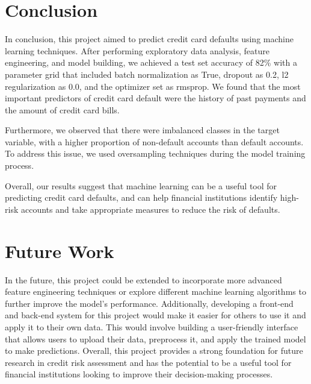 \documentclass[12pt,a4paper,oneside]{article}
\begin{document}
	\section{Conclusion}
	In conclusion, this project aimed to predict credit card defaults using machine learning techniques. After performing exploratory data analysis, feature engineering, and model building, we achieved a test set accuracy of 82\% with a parameter grid that included batch normalization as True, dropout as 0.2, l2 regularization as 0.0, and the optimizer set as rmsprop. We found that the most important predictors of credit card default were the history of past payments and the amount of credit card bills. 
	
	Furthermore, we observed that there were imbalanced classes in the target variable, with a higher proportion of non-default accounts than default accounts. To address this issue, we used oversampling techniques during the model training process. 
	
	Overall, our results suggest that machine learning can be a useful tool for predicting credit card defaults, and can help financial institutions identify high-risk accounts and take appropriate measures to reduce the risk of defaults.
	
	\section{Future Work}
	In the future, this project could be extended to incorporate more advanced
	feature engineering techniques or explore different machine learning algorithms to further improve the model's performance. Additionally, developing
	a front-end and back-end system for this project would make it easier for
	others to use it and apply it to their own data. This would involve building
	a user-friendly interface that allows users to upload their data, preprocess
	it, and apply the trained model to make predictions. Overall, this project
	provides a strong foundation for future research in credit risk assessment
	and has the potential to be a useful tool for financial institutions looking to
	improve their decision-making processes.
	
	

\newpage
	
\end{document}
